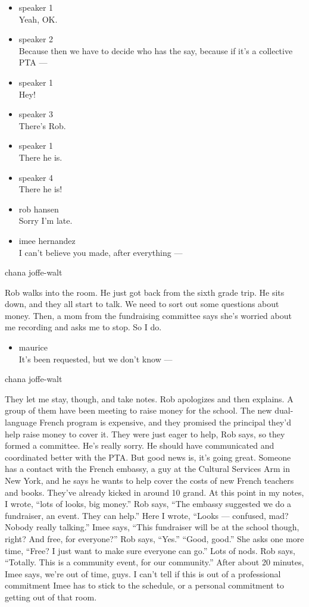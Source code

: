 \begin{itemize}
\item
  speaker 1\\
  Yeah, OK.
\item
  speaker 2\\
  Because then we have to decide who has the say, because if it's a
  collective PTA ---
\item
  speaker 1\\
  Hey!
\item
  speaker 3\\
  There's Rob.
\item
  speaker 1\\
  There he is.
\item
  speaker 4\\
  There he is!
\item
  rob hansen\\
  Sorry I'm late.
\item
  imee hernandez\\
  I can't believe you made, after everything ---
\end{itemize}

chana joffe-walt

Rob walks into the room. He just got back from the sixth grade trip. He
sits down, and they all start to talk. We need to sort out some
questions about money. Then, a mom from the fundraising committee says
she's worried about me recording and asks me to stop. So I do.

\begin{itemize}
\tightlist
\item
  maurice\\
  It's been requested, but we don't know ---
\end{itemize}

chana joffe-walt

They let me stay, though, and take notes. Rob apologizes and then
explains. A group of them have been meeting to raise money for the
school. The new dual-language French program is expensive, and they
promised the principal they'd help raise money to cover it. They were
just eager to help, Rob says, so they formed a committee. He's really
sorry. He should have communicated and coordinated better with the PTA.
But good news is, it's going great. Someone has a contact with the
French embassy, a guy at the Cultural Services Arm in New York, and he
says he wants to help cover the costs of new French teachers and books.
They've already kicked in around 10 grand. At this point in my notes, I
wrote, ``lots of looks, big money.'' Rob says, ``The embassy suggested
we do a fundraiser, an event. They can help.'' Here I wrote, ``Looks ---
confused, mad? Nobody really talking.'' Imee says, ``This fundraiser
will be at the school though, right? And free, for everyone?'' Rob says,
``Yes.'' ``Good, good.'' She asks one more time, ``Free? I just want to
make sure everyone can go.'' Lots of nods. Rob says, ``Totally. This is
a community event, for our community.'' After about 20 minutes, Imee
says, we're out of time, guys. I can't tell if this is out of a
professional commitment Imee has to stick to the schedule, or a personal
commitment to getting out of that room.

